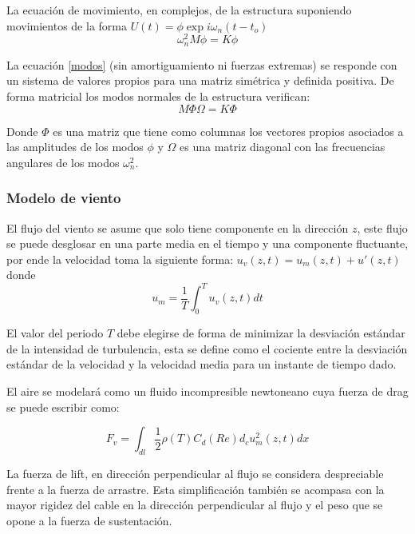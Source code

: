 La ecuación de movimiento, en complejos, de la estructura suponiendo movimientos de la forma $U(t)=\phi \exp{i\omega_n( t-t_o)}$ 
\begin{equation}\label{modos}
	\omega_n^2M\phi = K\phi
\end{equation}


La ecuación \eqref{modos} (sin amortiguamiento ni fuerzas extremas) se responde con un sistema de valores propios para una matriz simétrica y definida positiva. De forma matricial los modos normales de la estructura verifican:
\begin{equation}
	M \Phi \Omega =K\Phi
\end{equation}


Donde $\Phi $ es una matriz que tiene como columnas los vectores propios asociados a las amplitudes de los modos $\phi$ y $\Omega$ es una matriz diagonal con las frecuencias angulares de los modos $\omega_n^2$.

\subsubsection{Modelo de viento}


El flujo del viento se asume que solo tiene componente en la dirección $z$, este flujo se puede desglosar en una parte media en el tiempo y una componente fluctuante, por ende la velocidad toma la siguiente forma: $u_v(z,t)=u_m(z,t)+{u}'(z,t)  $ donde 
\begin{equation}
	u_m=\frac{1}{T}\int_{0}^{T}u_v(z,t)dt
\end{equation}


El valor del periodo $T$ debe elegirse de forma de minimizar la desviación estándar de la intensidad de turbulencia, esta se define como el cociente entre la desviación estándar de la velocidad y la velocidad media para un instante de tiempo dado.

El aire se modelará como un fluido incompresible newtoneano cuya fuerza de drag se puede escribir como:

\begin{equation}
	F_v=\int _{dl}\frac{1}{2}\rho (T)C_d(Re)d_cu_m^2(z,t)dx
\end{equation}



La fuerza de lift, en dirección perpendicular al flujo se considera despreciable frente a la fuerza de arrastre. Esta simplificación también se acompasa con la mayor rigidez del cable en la dirección perpendicular al flujo y el peso que se opone a la fuerza de sustentación. 


